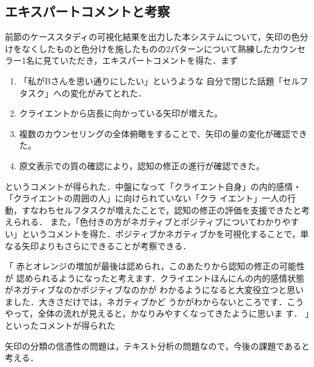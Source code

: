 \documentclass[shuuron]{kuee}
\begin{document}
%

\subsection{エキスパートコメントと考察}

前節のケーススタディの可視化結果を出力した本システムについて，矢印の色分けをなくしたものと色分けを施したものの2パターンについて熟練したカウンセラー1名に見ていただき，エキスパートコメントを得た．まず
\begin{enumerate}

  \item 「私がBさんを思い通りにしたい」というような
  自分で閉じた話題「セルフタスク」への変化がみてとれた．
  \item クライエントから店長に向かっている矢印が増えた。
  \item 複数のカウンセリングの全体俯瞰をすることで、矢印の量の変化が確認できた。
  \item 原文表示での質の確認により，認知の修正の進行が確認できた。
\end{enumerate}
というコメントが得られた．中盤になって「クライエント自身」の内的感情・「クライエントの周囲の人」に向けられていない「クラ
イエント」一人の行動，すなわちセルフタスクが増えたことで，認知の修正の評価を支援できたと考えられる．
また，「色付きの方がネガティブとポジティブについてわかりやすい」というコメントを得た．ポジティブかネガティブかを可視化することで，単なる矢印よりもさらにできることが考察できる．


「
赤とオレンジの増加が最後は認められ，このあたりから認知の修正の可能性が
認められるようになったと考えます．クライエントほんにんの内的感情状態がネガティブなのかポジティブなのかが
わかるようになると大変役立つと思いました．大きさだけでは，ネガティブかど
うかがわからないところです．こうやって，全体の流れが見えると，かなりみやすくなってきたように思いま
す．
」といったコメントが得られた

矢印の分類の信憑性の問題は，テキスト分析の問題なので，今後の課題であると考える．
\end{document}
